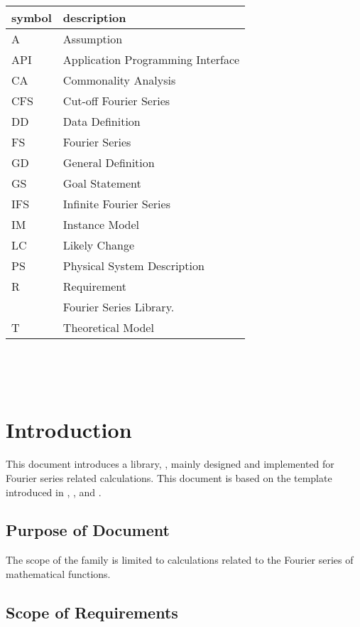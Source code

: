 \documentclass[12pt]{article}
\begin{document}
\renewcommand{\arraystretch}{1.2}
\begin{tabular}{l l} 
	\toprule		
	\textbf{symbol} & \textbf{description}\\
	\midrule 
	A & Assumption\\
	API & Application Programming Interface\\
	CA & Commonality Analysis\\
	CFS & Cut-off Fourier Series\\
	DD & Data Definition\\
	FS & Fourier Series\\
	GD & General Definition\\
	GS & Goal Statement\\
	IFS & Infinite Fourier Series\\
	IM & Instance Model\\
	LC & Likely Change\\
	PS & Physical System Description\\
	R & Requirement\\
	\progname{} & Fourier Series Library.\\
	T & Theoretical Model\\
	\bottomrule
\end{tabular}\\

\newpage

\tableofcontents

~\newpage



\section{Introduction}
This document introduces a library, \progname, mainly designed and implemented 
for Fourier series related calculations. This document is based on the 
template introduced in \cite{Smith2006}, \cite{SmithAndLai2005}, 
and \cite{SmithMcCutchanAndCarette2017}.


\subsection{Purpose of Document}

The scope of the family is limited to calculations related to the Fourier 
series of mathematical functions.

\subsection{Scope of Requirements} 
\end{document}
